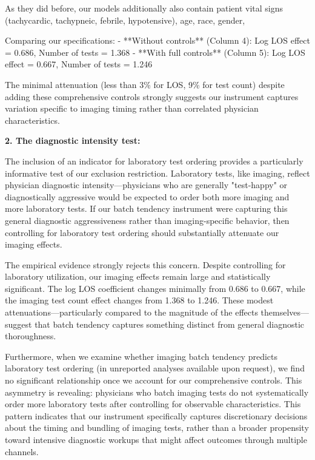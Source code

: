 \documentclass[11pt]{article}
\newcommand{\1}{\hbox{\rm 1\kern-.35em 1}}
\begin{document}
{As they did before, our models additionally also contain patient vital signs (tachycardic, tachypneic, febrile, hypotensive), age, race,
gender,

Comparing our specifications:
- **Without controls** (Column 4): Log LOS effect = 0.686, Number of tests = 1.368
- **With full controls** (Column 5): Log LOS effect = 0.667, Number of tests = 1.246

The minimal attenuation (less than 3\% for LOS, 9\% for test count) despite adding these comprehensive controls strongly suggests our instrument captures variation specific to imaging timing rather than correlated physician characteristics.

\textbf{2. The diagnostic intensity test:}

The inclusion of an indicator for laboratory test ordering provides a particularly informative test of our exclusion restriction. Laboratory tests, like imaging, reflect physician diagnostic intensity—physicians who are generally "test-happy" or diagnostically aggressive would be expected to order both more imaging and more laboratory tests. If our batch tendency instrument were capturing this general diagnostic aggressiveness rather than imaging-specific behavior, then controlling for laboratory test ordering should substantially attenuate our imaging effects.

The empirical evidence strongly rejects this concern. Despite controlling for laboratory utilization, our imaging effects remain large and statistically significant. The log LOS coefficient changes minimally from 0.686 to 0.667, while the imaging test count effect changes from 1.368 to 1.246. These modest attenuations—particularly compared to the magnitude of the effects themselves—suggest that batch tendency captures something distinct from general diagnostic thoroughness.

Furthermore, when we examine whether imaging batch tendency predicts laboratory test ordering (in unreported analyses available upon request), we find no significant relationship once we account for our comprehensive controls. This asymmetry is revealing: physicians who batch imaging tests do not systematically order more laboratory tests after controlling for observable characteristics. This pattern indicates that our instrument specifically captures discretionary decisions about the timing and bundling of imaging tests, rather than a broader propensity toward intensive diagnostic workups that might affect outcomes through multiple channels.

}
\end{document}
